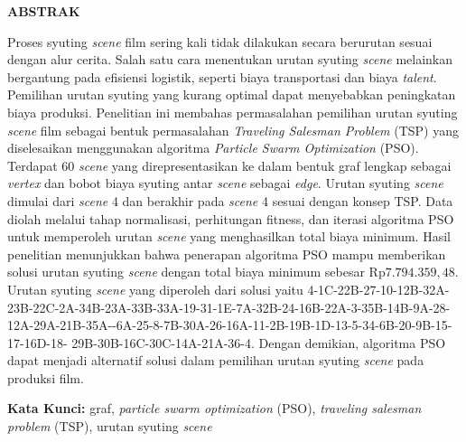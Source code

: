 \vspace{0.1cm}

{
    \singlespacing
    \begin{center}
        \textbf{ABSTRAK}
    \end{center}
    \vspace{0.5cm}

    {\frenchspacing
        Proses syuting \textit{scene} film sering kali tidak dilakukan secara berurutan sesuai dengan alur cerita.
        Salah satu cara menentukan urutan syuting \textit{scene} melainkan bergantung pada efisiensi logistik, seperti biaya transportasi dan biaya \textit{talent}.
        Pemilihan urutan syuting yang kurang optimal dapat menyebabkan peningkatan biaya produksi.
        Penelitian ini membahas permasalahan pemilihan urutan syuting \textit{scene} film sebagai bentuk permasalahan \textit{Traveling Salesman Problem} (TSP) yang diselesaikan menggunakan algoritma \textit{Particle Swarm Optimization} (PSO).
        Terdapat 60 \textit{scene} yang direpresentasikan ke dalam bentuk graf lengkap sebagai \textit{vertex} dan bobot biaya syuting antar \textit{scene} sebagai \textit{edge}.
        Urutan syuting \textit{scene} dimulai dari \textit{scene} 4 dan berakhir pada \textit{scene} 4 sesuai dengan konsep TSP.
        Data diolah melalui tahap normalisasi, perhitungan fitness, dan iterasi algoritma PSO untuk memperoleh urutan \textit{scene} yang menghasilkan total biaya minimum.
        Hasil penelitian menunjukkan bahwa penerapan algoritma PSO mampu memberikan solusi urutan syuting \textit{scene} dengan total biaya minimum sebesar Rp$7.794.359,48$.
        Urutan syuting \textit{scene} yang diperoleh dari solusi yaitu 4-1C-22B-27-10-12B-32A-23B-22C-2A-34B-23A-33B-33A-19-31-1E-7A-32B-24-16B-22A-3-35B-14B-9A-28-12A-29A-21B-35A--6A-25-8-7B-30A-26-16A-11-2B-19B-1D-13-5-34-6B-20-9B-15-17-16D-18-\newline
        29B-30B-16C-30C-14A-21A-36-4.
        Dengan demikian, algoritma PSO dapat menjadi alternatif solusi dalam pemilihan urutan syuting \textit{scene} pada produksi film.

        \vspace*{0.5cm}
        \noindent \textbf{Kata Kunci:} graf, \textit{particle swarm optimization} (PSO), \textit{traveling salesman problem} (TSP), urutan syuting \textit{scene}
    }
}

\pagebreak